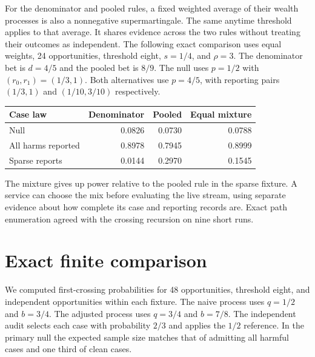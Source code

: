 \documentclass[11pt]{article}
\begin{document}
For the denominator and pooled rules, a fixed weighted average
of their wealth processes is also a nonnegative supermartingale.
The same anytime threshold applies to that average. It shares
evidence across the two rules without treating their outcomes as
independent. The following exact comparison uses equal weights,
24 opportunities, threshold eight, $s=1/4$, and $\rho=3$.
The denominator bet is $d=4/5$ and the pooled bet is $8/9$.
The null uses $p=1/2$ with $(r_0,r_1)=(1/3,1)$. Both
alternatives use $p=4/5$, with reporting pairs $(1/3,1)$
and $(1/10,3/10)$ respectively.
\begin{center}
\begin{tabular}{lrrr}
\toprule
Case law & Denominator & Pooled & Equal mixture \\
\midrule
Null & 0.0826 & 0.0730 & 0.0788 \\
All harms reported & 0.8978 & 0.7945 & 0.8999 \\
Sparse reports & 0.0144 & 0.2970 & 0.1545 \\
\bottomrule
\end{tabular}
\end{center}
The mixture gives up power relative to the pooled rule in the
sparse fixture. A service can choose the mix before evaluating
the live stream, using separate evidence about how complete its
case and reporting records are. Exact path enumeration agreed
with the crossing recursion on nine short runs.

\section{Exact finite comparison}
We computed first-crossing probabilities for 48 opportunities,
threshold eight, and independent opportunities within each fixture.
The naive process uses $q=1/2$ and $b=3/4$. The adjusted process
uses $q=3/4$ and $b=7/8$. The independent audit selects each case
with probability $2/3$ and applies the $1/2$ reference. In the
primary null the expected sample size matches that of admitting
all harmful cases and one third of clean cases.
\end{document}
